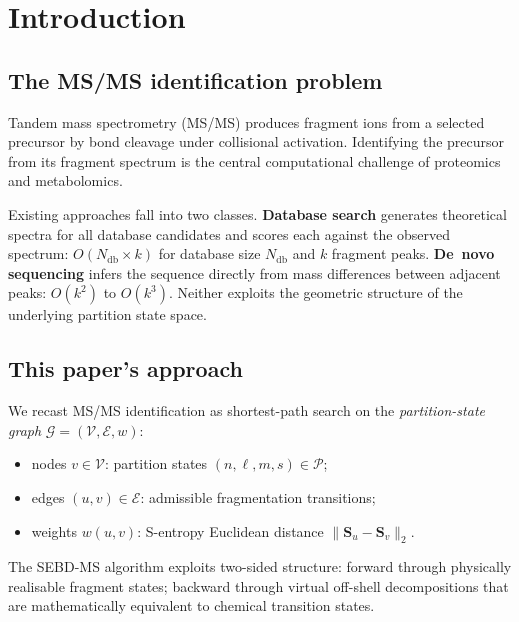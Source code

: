 \documentclass[twocolumn,10pt,a4paper]{article}
\theoremstyle{thmstyle}
\theoremstyle{definition}
\theoremstyle{remark}
\newcommand{\Parts}{\mathcal{P}}
\newcommand{\Sv}{\mathbf{S}}
\newcommand{\calG}{\mathcal{G}}
\newcommand{\calV}{\mathcal{V}}
\newcommand{\calE}{\mathcal{E}}
\begin{document}
\tableofcontents

\section{Introduction}
\label{sec:intro}

\subsection{The MS/MS identification problem}

Tandem mass spectrometry (MS/MS) produces fragment ions from a selected
precursor by bond cleavage under collisional activation.  Identifying the
precursor from its fragment spectrum is the central computational challenge
of proteomics and metabolomics.

Existing approaches fall into two classes. \textbf{Database search}
\citep{eng1994,perkins1999} generates theoretical spectra for all database
candidates and scores each against the observed spectrum: $O(N_\text{db}
\times k)$ for database size $N_\text{db}$ and $k$ fragment peaks.
\textbf{De~novo sequencing} \citep{frank2005,ma2003} infers the sequence
directly from mass differences between adjacent peaks: $O(k^2)$ to $O(k^3)$.
Neither exploits the geometric structure of the underlying partition state
space.

\subsection{This paper's approach}

We recast MS/MS identification as shortest-path search on the
\emph{partition-state graph} $\calG = (\calV, \calE, w)$:
\begin{itemize}[nosep]
\item nodes $v \in \calV$: partition states $(n,\ell,m,s) \in \Parts$;
\item edges $(u,v) \in \calE$: admissible fragmentation transitions;
\item weights $w(u,v)$: S-entropy Euclidean distance $\|\Sv_u - \Sv_v\|_2$.
\end{itemize}

The SEBD-MS algorithm exploits two-sided structure: forward through
physically realisable fragment states; backward through virtual off-shell
decompositions that are mathematically equivalent to chemical transition
states.
\end{document}
